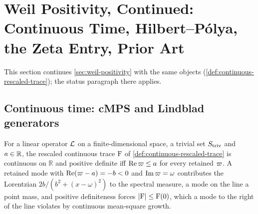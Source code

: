 
\section{Weil Positivity, Continued: Continuous Time, Hilbert--P\'olya, the Zeta Entry, Prior Art}
\label{sec:weil-positivity-continuous}

This section continues \cref{sec:weil-positivity} with the same objects
(\cref{def:continuous-rescaled-trace}); the status paragraph there applies.

\subsection{Continuous time: cMPS and Lindblad generators}

\begin{theorem}
\label{thm:weil-positivity-continuous}
For a linear operator $\mathcal L$ on a finite-dimensional space, a trivial set $S_{\mathrm{triv}}$ and
$a\in\mathbb R$, the rescaled continuous trace $\mathrm{F}$ of
\cref{def:continuous-rescaled-trace} is continuous on $\mathbb R$ and positive definite iff
$\operatorname{Re}\varpi\le a$ for every retained $\varpi$. A retained mode with $\operatorname{Re}(\varpi-a) = -b<0$
and $\operatorname{Im}\varpi = \omega$ contributes the Lorentzian $2b/(b^2+(x-\omega)^2)$ to the
spectral measure, a mode on the line a point mass, and positive definiteness forces
$|\mathrm{F}|\le\mathrm{F}(0)$, which a mode to the right of the line violates by continuous
mean-square growth.
\end{theorem}


